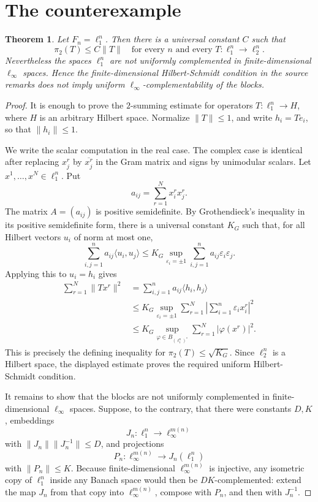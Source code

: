 \documentclass[11pt]{article}
\newtheorem{theorem}{Theorem}
\begin{document}
\section*{The counterexample}

\begin{theorem}
Let \(F_n=\ell_1^n\).  Then there is a universal constant \(C\) such
that
\[
        \pi_2(T)\le C\|T\|
        \quad\text{for every }n\text{ and every }T:\ell_1^n\to\ell_2^n.
\]
Nevertheless the spaces \(\ell_1^n\) are not uniformly complemented in
finite-dimensional \(\ell_\infty\) spaces.  Hence the finite-dimensional
Hilbert-Schmidt condition in the source remarks does not imply uniform
\(\ell_\infty\)-complementability of the blocks.
\end{theorem}

\begin{proof}
It is enough to prove the \(2\)-summing estimate for operators
\(T:\ell_1^n\to H\), where \(H\) is an arbitrary Hilbert space.  Normalize
\(\|T\|\le 1\), and write \(h_i=T e_i\), so that \(\|h_i\|\le 1\).

We write the scalar computation in the real case.  The complex case is
identical after replacing \(x_j^r\) by \(\overline{x_j^r}\) in the Gram
matrix and signs by unimodular scalars.  Let
\(x^1,\ldots,x^N\in \ell_1^n\).  Put
\[
        a_{ij}=\sum_{r=1}^N x^r_i x^r_j .
\]
The matrix \(A=(a_{ij})\) is positive semidefinite.  By Grothendieck's
inequality in its positive semidefinite form, there is a universal
constant \(K_G\) such that, for all Hilbert vectors \(u_i\) of norm at
most one,
\[
        \sum_{i,j=1}^n a_{ij}\langle u_i,u_j\rangle
        \le
        K_G\sup_{\varepsilon_i=\pm1}
        \sum_{i,j=1}^n a_{ij}\varepsilon_i\varepsilon_j .
\]
Applying this to \(u_i=h_i\) gives
\[
\begin{aligned}
        \sum_{r=1}^N \|Tx^r\|^2
        &= \sum_{i,j=1}^n a_{ij}\langle h_i,h_j\rangle  \\
        &\le
        K_G\sup_{\varepsilon_i=\pm1}
        \sum_{r=1}^N\left|\sum_{i=1}^n \varepsilon_i x_i^r\right|^2  \\
        &\le
        K_G\sup_{\varphi\in B_{(\ell_1^n)^*}}
        \sum_{r=1}^N |\varphi(x^r)|^2 .
\end{aligned}
\]
This is precisely the defining inequality for
\(\pi_2(T)\le \sqrt{K_G}\).  Since \(\ell_2^n\) is a Hilbert space, the
displayed estimate proves the required uniform Hilbert-Schmidt condition.

It remains to show that the blocks are not uniformly complemented in
finite-dimensional \(\ell_\infty\) spaces.  Suppose, to the contrary,
that there were constants \(D,K\), embeddings
\[
        J_n:\ell_1^n\longrightarrow \ell_\infty^{m(n)}
\]
with \(\|J_n\|\|J_n^{-1}\|\le D\), and projections
\[
        P_n:\ell_\infty^{m(n)}\longrightarrow J_n(\ell_1^n)
\]
with \(\|P_n\|\le K\).  Because finite-dimensional
\(\ell_\infty^{m(n)}\) is injective, any isometric copy of \(\ell_1^n\)
inside any Banach space would then be \(DK\)-complemented: extend the
map \(J_n\) from that copy into \(\ell_\infty^{m(n)}\), compose with
\(P_n\), and then with \(J_n^{-1}\).


\end{proof}
\end{document}
